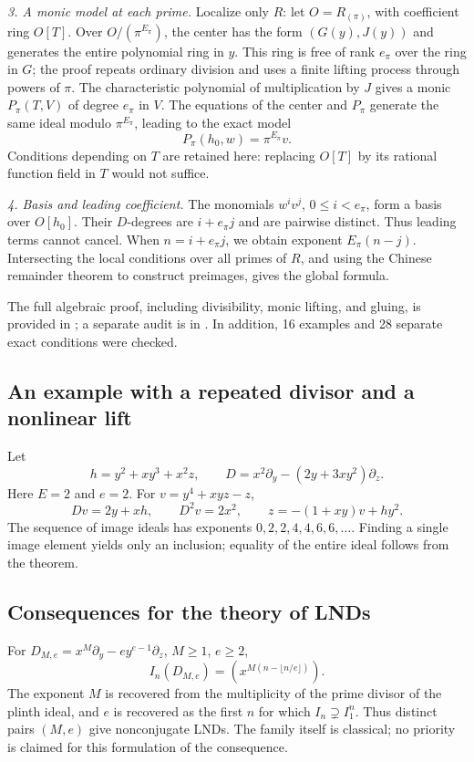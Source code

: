 \textit{3. A monic model at each prime.} Localize only $R$: let $O=R_{(\pi)}$, with coefficient ring $O[T]$. Over $O/(\pi^{E_\pi})$, the center has the form $(G(y),J(y))$ and generates the entire polynomial ring in $y$. This ring is free of rank $e_\pi$ over the ring in $G$; the proof repeats ordinary division and uses a finite lifting process through powers of $\pi$.
The characteristic polynomial of multiplication by $J$ gives a monic $P_\pi(T,V)$ of degree $e_\pi$ in $V$. The equations of the center and $P_\pi$ generate the same ideal modulo $\pi^{E_\pi}$, leading to the exact model
\[
P_\pi(h_0,w)=\pi^{E_\pi}v.
\]
Conditions depending on $T$ are retained here: replacing $O[T]$ by its rational function field in $T$ would not suffice.

\textit{4. Basis and leading coefficient.} The monomials $w^iv^j$, $0\le i<e_\pi$, form a basis over $O[h_0]$. Their $D$-degrees are $i+e_\pi j$ and are pairwise distinct. Thus leading terms cannot cancel. When $n=i+e_\pi j$, we obtain exponent $E_\pi(n-j)$. Intersecting the local conditions over all primes of $R$, and using the Chinese remainder theorem to construct preimages, gives the global formula.

The full algebraic proof, including divisibility, monic lifting, and gluing, is provided in ; a separate audit is in . In addition, 16 examples and 28 separate exact conditions were checked.

\subsection*{An example with a repeated divisor and a nonlinear lift}
Let
\[
h=y^2+xy^3+x^2z,\qquad D=x^2\partial_y-(2y+3xy^2)\partial_z.
\]
Here $E=2$ and $e=2$. For $v=y^4+xyz-z$,
\[
Dv=2y+xh,\qquad D^2v=2x^2,\qquad
z=-(1+xy)v+hy^2.
\]
The sequence of image ideals has exponents $0,2,2,4,4,6,6,\ldots$. Finding a single image element yields only an inclusion; equality of the entire ideal follows from the theorem.

\subsection*{Consequences for the theory of LNDs}
For $D_{M,e}=x^M\partial_y-e y^{e-1}\partial_z$, $M\ge1$, $e\ge2$,
\[
I_n(D_{M,e})=(x^{M(n-\lfloor n/e\rfloor)}).
\]
The exponent $M$ is recovered from the multiplicity of the prime divisor of the plinth ideal, and $e$ is recovered as the first $n$ for which $I_n\supsetneq I_1^n$. Thus distinct pairs $(M,e)$ give nonconjugate LNDs. The family itself is classical; no priority is claimed for this formulation of the consequence.

